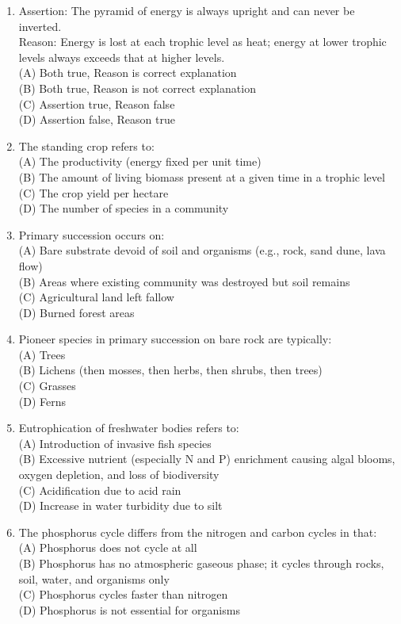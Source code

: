 \documentclass{article}
\begin{document}
\begin{enumerate}[label=Q\arabic*.]
\item Assertion: The pyramid of energy is always upright and can never be inverted.\\
Reason: Energy is lost at each trophic level as heat; energy at lower trophic levels always exceeds that at higher levels.
\\(A) Both true, Reason is correct explanation
\\(B) Both true, Reason is not correct explanation
\\(C) Assertion true, Reason false
\\(D) Assertion false, Reason true

\item The standing crop refers to:
\\(A) The productivity (energy fixed per unit time)
\\(B) The amount of living biomass present at a given time in a trophic level
\\(C) The crop yield per hectare
\\(D) The number of species in a community

\item Primary succession occurs on:
\\(A) Bare substrate devoid of soil and organisms (e.g., rock, sand dune, lava flow)
\\(B) Areas where existing community was destroyed but soil remains
\\(C) Agricultural land left fallow
\\(D) Burned forest areas

\item Pioneer species in primary succession on bare rock are typically:
\\(A) Trees
\\(B) Lichens (then mosses, then herbs, then shrubs, then trees)
\\(C) Grasses
\\(D) Ferns

\item Eutrophication of freshwater bodies refers to:
\\(A) Introduction of invasive fish species
\\(B) Excessive nutrient (especially N and P) enrichment causing algal blooms, oxygen depletion, and loss of biodiversity
\\(C) Acidification due to acid rain
\\(D) Increase in water turbidity due to silt

\item The phosphorus cycle differs from the nitrogen and carbon cycles in that:
\\(A) Phosphorus does not cycle at all
\\(B) Phosphorus has no atmospheric gaseous phase; it cycles through rocks, soil, water, and organisms only
\\(C) Phosphorus cycles faster than nitrogen
\\(D) Phosphorus is not essential for organisms


\end{enumerate}
\end{document}
